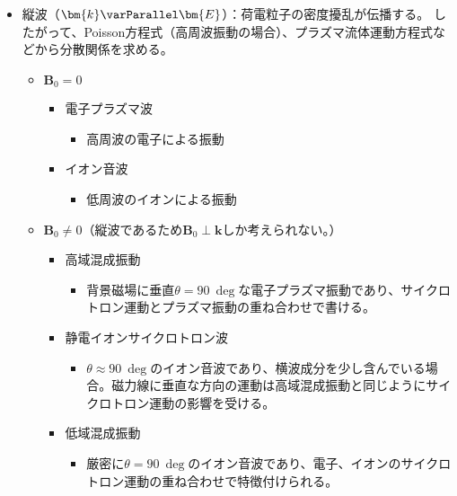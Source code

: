 \begin{itemize}
	\item 縦波（$\bm{k}\varParallel \bm{E}$）：{\color{red}荷電粒子の密度擾乱}が伝播する。
	      したがって、{\color{red}Poisson方程式}（高周波振動の場合）、{\color{red}プラズマ流体運動方程式}などから分散関係を求める。
	      \begin{itemize}
		      \item $\bm{B}_0 = 0$
		            \begin{itemize}
			            \item 電子プラズマ波
			                  \begin{itemize}
				                  \item 高周波の電子による振動
			                  \end{itemize}
			            \item イオン音波
			                  \begin{itemize}
				                  \item 低周波のイオンによる振動
			                  \end{itemize}
		            \end{itemize}
		      \item $\bm{B}_0 \neq 0$（縦波であるため$\bm{B}_0\perp\bm{k}$しか考えられない。）
		            \begin{itemize}
			            \item 高域混成振動
			                  \begin{itemize}
				                  \item 背景磁場に垂直$\theta=\SI{90}{\deg}$な電子プラズマ振動であり、サイクロトロン運動とプラズマ振動の重ね合わせで書ける。
			                  \end{itemize}
			            \item 静電イオンサイクロトロン波
			                  \begin{itemize}
				                  \item $\theta\approx \SI{90}{\deg}$のイオン音波であり、横波成分を少し含んでいる場合。磁力線に垂直な方向の運動は高域混成振動と同じようにサイクロトロン運動の影響を受ける。
			                  \end{itemize}
			            \item 低域混成振動
			                  \begin{itemize}
				                  \item 厳密に$\theta = \SI{90}{\deg}$のイオン音波であり、電子、イオンのサイクロトロン運動の重ね合わせで特徴付けられる。

\end{itemize}
\end{itemize}
\end{itemize}
\end{itemize}
